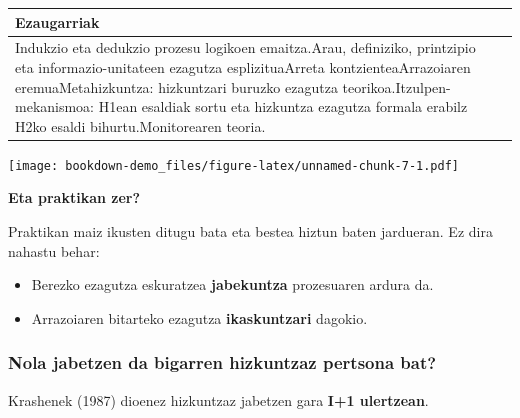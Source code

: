 \documentclass[]{book}
\providecommand{\tightlist}{%
  \setlength{\itemsep}{0pt}\setlength{\parskip}{0pt}}
\begin{document}
\begin{longtable}[]{@{}lcl@{}}
\toprule
\begin{minipage}[b]{0.81\columnwidth}\raggedright
Ezaugarriak\strut
\end{minipage} & \begin{minipage}[b]{0.05\columnwidth}\centering
\strut
\end{minipage} & \begin{minipage}[b]{0.05\columnwidth}\raggedright
\strut
\end{minipage}\tabularnewline
\midrule
\endhead
\begin{minipage}[t]{0.81\columnwidth}\raggedright
Indukzio eta dedukzio prozesu logikoen emaitza.Arau, definiziko, printzipio eta informazio-unitateen ezagutza esplizituaArreta kontzienteaArrazoiaren eremuaMetahizkuntza: hizkuntzari buruzko ezagutza teorikoa.Itzulpen-mekanismoa: H1ean esaldiak sortu eta hizkuntza ezagutza formala erabilz H2ko esaldi bihurtu.Monitorearen teoria.\strut
\end{minipage} & \begin{minipage}[t]{0.05\columnwidth}\centering
\strut
\end{minipage} & \begin{minipage}[t]{0.05\columnwidth}\raggedright
\strut
\end{minipage}\tabularnewline
\bottomrule
\end{longtable}

\texttt{[image: bookdown-demo\_files/figure-latex/unnamed-chunk-7-1.pdf]}

\textbf{Eta praktikan zer?}

Praktikan maiz ikusten ditugu bata eta bestea hiztun baten jardueran. Ez dira nahastu behar:

\begin{itemize}
\tightlist
\item
  Berezko ezagutza eskuratzea \textbf{jabekuntza} prozesuaren ardura da.
\item
  Arrazoiaren bitarteko ezagutza \textbf{ikaskuntzari} dagokio.
\end{itemize}

\hypertarget{nola-jabetzen-da-bigarren-hizkuntzaz-pertsona-bat}{%
\subsubsection{Nola jabetzen da bigarren hizkuntzaz pertsona bat?}\label{nola-jabetzen-da-bigarren-hizkuntzaz-pertsona-bat}}

Krashenek (1987) dioenez hizkuntzaz jabetzen gara \textbf{I+1 ulertzean}.
\end{document}
